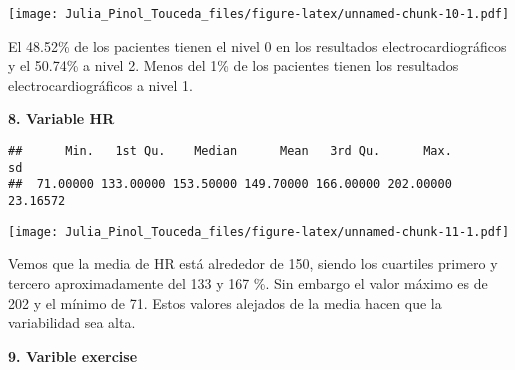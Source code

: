 \documentclass[]{article}
\newenvironment{Shaded}{\begin{snugshade}}{\end{snugshade}}
\newcommand{\KeywordTok}[1]{\textcolor[rgb]{0.13,0.29,0.53}{\textbf{#1}}}
\newcommand{\DataTypeTok}[1]{\textcolor[rgb]{0.13,0.29,0.53}{#1}}
\newcommand{\DecValTok}[1]{\textcolor[rgb]{0.00,0.00,0.81}{#1}}
\newcommand{\StringTok}[1]{\textcolor[rgb]{0.31,0.60,0.02}{#1}}
\newcommand{\OperatorTok}[1]{\textcolor[rgb]{0.81,0.36,0.00}{\textbf{#1}}}
\newcommand{\NormalTok}[1]{#1}
\begin{document}
\texttt{[image: Julia\_Pinol\_Touceda\_files/figure-latex/unnamed-chunk-10-1.pdf]}

El 48.52\% de los pacientes tienen el nivel 0 en los resultados
electrocardiográficos y el 50.74\% a nivel 2. Menos del 1\% de los
pacientes tienen los resultados electrocardiográficos a nivel 1.

\textbf{8. Variable HR}

\begin{Shaded}
\end{Shaded}

\begin{verbatim}
##      Min.   1st Qu.    Median      Mean   3rd Qu.      Max.        sd 
##  71.00000 133.00000 153.50000 149.70000 166.00000 202.00000  23.16572
\end{verbatim}

\begin{Shaded}
\end{Shaded}

\texttt{[image: Julia\_Pinol\_Touceda\_files/figure-latex/unnamed-chunk-11-1.pdf]}

Vemos que la media de HR está alrededor de 150, siendo los cuartiles
primero y tercero aproximadamente del 133 y 167 \%. Sin embargo el valor
máximo es de 202 y el mínimo de 71. Estos valores alejados de la media
hacen que la variabilidad sea alta.

\textbf{9. Varible exercise}
\end{document}
